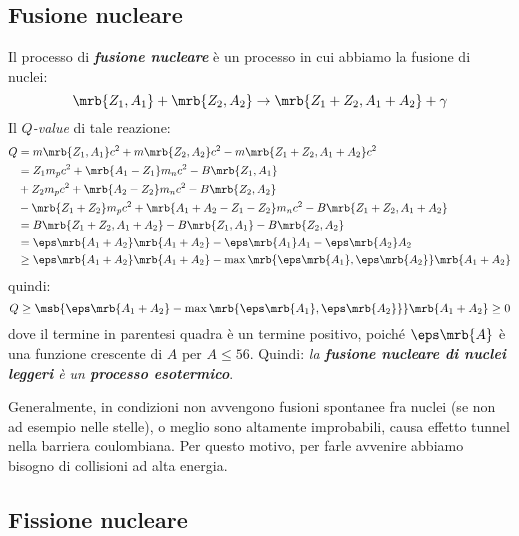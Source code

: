 \subsection{Fusione nucleare}
Il processo di \textit{\textbf{fusione nucleare}} è un processo in cui abbiamo
la fusione di nuclei:
\[
  \mrb{Z_1, A_1} + \mrb{Z_2, A_2} \rightarrow \mrb{Z_1 + Z_2, A_1 + A_2} +
  \gamma
\]
Il \textit{$Q$-value} di tale reazione:
\begin{align*}
  Q &= m \mrb{Z_1, A_1} c^2 + m \mrb{Z_2, A_2} c^2 - m \mrb{Z_1 + Z_2, A_1 +
  A_2} c^2
  \\
  &= Z_1 m_p c^2 + \mrb{A_1 - Z_1} m_n c^2 - B \mrb{Z_1, A_1}
  \\
  & + Z_2 m_p c^2 +
  \mrb{A_2 - Z_2} m_n c^2 - B \mrb{Z_2, A_2}
  \\
  & - \mrb{Z_1 + Z_2} m_p c^2 + \mrb{A_1 + A_2 - Z_1 - Z_2} m_n c^2 - B
  \mrb{Z_1 + Z_2, A_1 + A_2}
  \\
  &= B \mrb{Z_1 + Z_2, A_1 + A_2} - B \mrb{Z_1, A_1} - B \mrb{Z_2, A_2}
  \\
  &= \eps \mrb{A_1 + A_2} \mrb{A_1 + A_2} - \eps \mrb{A_1} A_1 - \eps \mrb{A_2}
  A_2
  \\
  &\geq \eps \mrb{A_1 + A_2} \mrb{A_1 + A_2} - \max \mrb{\eps \mrb{A_1}, \eps
  \mrb{A_2}} \mrb{A_1 + A_2}
\end{align*}
quindi:
\[
  Q \geq \msb{\eps \mrb{A_1 + A_2} - \max \mrb{\eps \mrb{A_1}, \eps \mrb{A_2}}}
  \mrb{A_1 + A_2} \geq 0
\]
dove il termine in parentesi quadra è un termine positivo, poiché $\eps
\mrb{A}$ è una funzione crescente di $A$ per $A \leq 56$.
Quindi: \textit{la \textbf{fusione nucleare di nuclei leggeri} è un
\textbf{processo esotermico}}.
\begin{note}[]
  Generalmente, in condizioni  non avvengono fusioni
  spontanee fra nuclei (se non ad esempio nelle stelle), o meglio sono
  altamente improbabili, causa effetto tunnel nella barriera coulombiana. Per
  questo motivo, per farle avvenire abbiamo bisogno di collisioni ad alta
  energia.
\end{note}

\subsection{Fissione nucleare}

